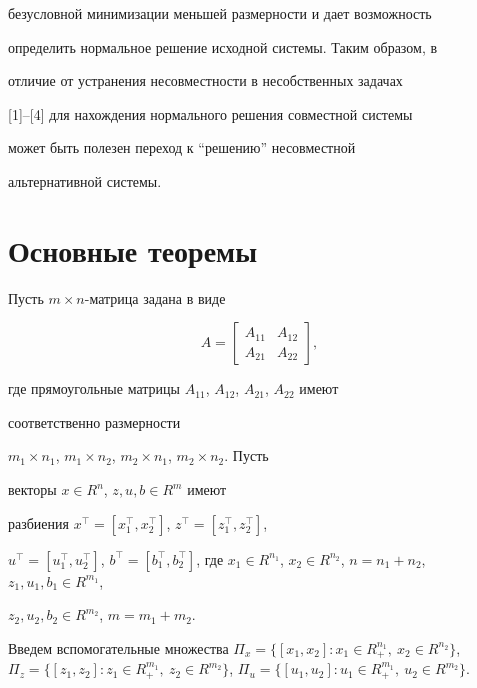 безусловной минимизации меньшей размерности и дает возможность


определить нормальное решение исходной системы. Таким образом, в


отличие от устранения несовместности в несобственных задачах


[1]--[4] для нахождения нормального решения совместной системы


может быть полезен переход к ``решению'' несовместной


альтернативной системы.





\section{Основные теоремы}





Пусть $m\times n$-матрица задана в виде


$$


A=


\begin{bmatrix}


A_{11} & A_{12} \\ A_{21} & A_{22}


\end{bmatrix}


,


$$


где прямоугольные матрицы $A_{11}$, $A_{12}$, $A_{21}$, $A_{22}$ имеют 


соответственно размерности


$m_1\times n_1$, $m_1\times n_2$, $m_2\times n_1$, $m_2\times n_2$. Пусть 


векторы $x\in R^n$, $z,u,b\in R^m$ имеют


разбиения $x^\top=[x^\top_1,x^\top_2]$, $z^\top=[z^\top_1,z^\top_2]$, 


$u^\top=[u^\top_1,u^\top_2]$, $b^\top=[b^\top_1,b^\top_2]$, где $x_1\in 


R^{n_1}$, $x_2\in R^{n_2}$, $n=n_1+n_2$, $z_1,u_1,b_1\in R^{m_1}$, 


$z_2,u_2,b_2\in R^{m_2}$, $m=m_1+m_2$.


Введем вспомогательные множества $\Pi_x=\{[x_1,x_2]: x_1\in R^{n_1}_+,\ 


x_2\in R^{n_2}\}$, $\Pi_z=\{[z_1,z_2]:z_1\in R^{m_1}_+,\ z_2\in 


R^{m_2}\}$, $\Pi_u=\{[u_1,u_2]:u_1\in R^{m_1}_+,\ u_2\in R^{m_2}\}$.






